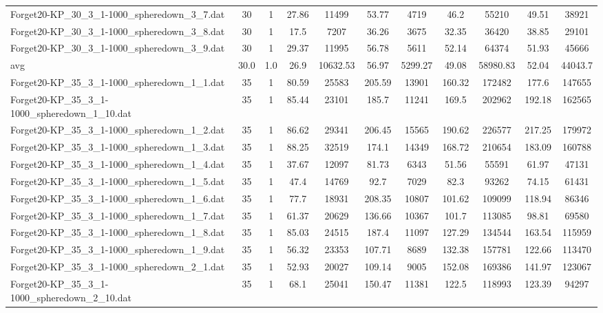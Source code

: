 \begin{table}[!ht]
\begin{tabular}{lcccccccccc}
Forget20-KP\_30\_3\_1-1000\_spheredown\_3\_7.dat & 30 & 1 & 27.86 & 11499 & 53.77 & 4719 & 46.2 & 55210 & 49.51 & 38921 \\
Forget20-KP\_30\_3\_1-1000\_spheredown\_3\_8.dat & 30 & 1 & 17.5 & 7207 & 36.26 & 3675 & 32.35 & 36420 & 38.85 & 29101 \\
Forget20-KP\_30\_3\_1-1000\_spheredown\_3\_9.dat & 30 & 1 & 29.37 & 11995 & 56.78 & 5611 & 52.14 & 64374 & 51.93 & 45666 \\
\hline avg & 30.0 & 1.0 & 26.9& 10632.53 & 56.97& 5299.27 & 49.08& 58980.83 & 52.04& 44043.7\\ \hline
Forget20-KP\_35\_3\_1-1000\_spheredown\_1\_1.dat & 35 & 1 & 80.59 & 25583 & 205.59 & 13901 & 160.32 & 172482 & 177.6 & 147655 \\
Forget20-KP\_35\_3\_1-1000\_spheredown\_1\_10.dat & 35 & 1 & 85.44 & 23101 & 185.7 & 11241 & 169.5 & 202962 & 192.18 & 162565 \\
Forget20-KP\_35\_3\_1-1000\_spheredown\_1\_2.dat & 35 & 1 & 86.62 & 29341 & 206.45 & 15565 & 190.62 & 226577 & 217.25 & 179972 \\
Forget20-KP\_35\_3\_1-1000\_spheredown\_1\_3.dat & 35 & 1 & 88.25 & 32519 & 174.1 & 14349 & 168.72 & 210654 & 183.09 & 160788 \\
Forget20-KP\_35\_3\_1-1000\_spheredown\_1\_4.dat & 35 & 1 & 37.67 & 12097 & 81.73 & 6343 & 51.56 & 55591 & 61.97 & 47131 \\
Forget20-KP\_35\_3\_1-1000\_spheredown\_1\_5.dat & 35 & 1 & 47.4 & 14769 & 92.7 & 7029 & 82.3 & 93262 & 74.15 & 61431 \\
Forget20-KP\_35\_3\_1-1000\_spheredown\_1\_6.dat & 35 & 1 & 77.7 & 18931 & 208.35 & 10807 & 101.62 & 109099 & 118.94 & 86346 \\
Forget20-KP\_35\_3\_1-1000\_spheredown\_1\_7.dat & 35 & 1 & 61.37 & 20629 & 136.66 & 10367 & 101.7 & 113085 & 98.81 & 69580 \\
Forget20-KP\_35\_3\_1-1000\_spheredown\_1\_8.dat & 35 & 1 & 85.03 & 24515 & 187.4 & 11097 & 127.29 & 134544 & 163.54 & 115959 \\
Forget20-KP\_35\_3\_1-1000\_spheredown\_1\_9.dat & 35 & 1 & 56.32 & 23353 & 107.71 & 8689 & 132.38 & 157781 & 122.66 & 113470 \\
Forget20-KP\_35\_3\_1-1000\_spheredown\_2\_1.dat & 35 & 1 & 52.93 & 20027 & 109.14 & 9005 & 152.08 & 169386 & 141.97 & 123067 \\
Forget20-KP\_35\_3\_1-1000\_spheredown\_2\_10.dat & 35 & 1 & 68.1 & 25041 & 150.47 & 11381 & 122.5 & 118993 & 123.39 & 94297 \\

\end{tabular}
\end{table}

